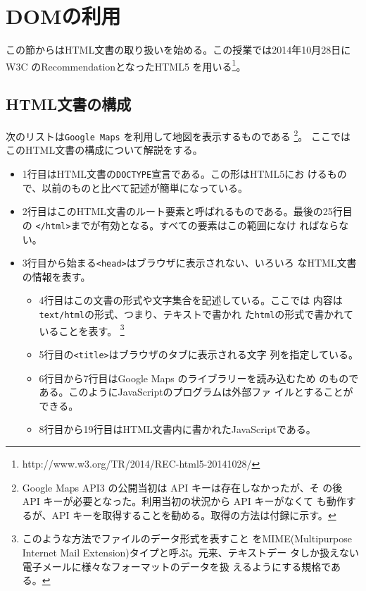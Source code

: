 \newcommand{\Elm}[1]{\texttt{<#1>}}
\newcommand{\Yes}{$\bigcirc$}
\newcommand{\No}{$\times$}
\chapter{DOMの利用}
この節からはHTML文書の取り扱いを始める。この授業では2014年10月28日にW3C
のRecommendationとなったHTML5
を用いる\footnote{http://www.w3.org/TR/2014/REC-html5-20141028/}。
\section{HTML文書の構成}
\begin{Exec}\upshape\label{ExGoogleMaps}
 次のリストは\texttt{Google Maps} を利用して地図を表示するものである
 \footnote{Google Maps API3 の公開当初は API キーは存在しなかったが、そ
 の後 API キーが必要となった。利用当初の状況から API キーがなくて
 も動作するが、API キーを取得することを勧める。取得の方法は付録に示す。}。
ここではこのHTML文書の構成について解説をする。
\begin{itemize}
 \item 1行目はHTML文書の\texttt{DOCTYPE}宣言である。この形はHTML5にお
       けるもので、以前のものと比べて記述が簡単になっている。
 \item 2行目はこのHTML文書のルート要素と呼ばれるものである。最後の25行目
       の \Elm{/html}までが有効となる。すべての要素はこの範囲になけ
       ればならない。
 \item 3行目から始まる\Elm{head}はブラウザに表示されない、いろいろ
       なHTML文書の情報を表す。
         \begin{itemize}
	  \item 4行目はこの文書の形式や文字集合を記述している。ここでは
		内容は\texttt{text/html}の形式、つまり、テキストで書かれ
		た\texttt{html}の形式で書かれていることを表す。
		\footnote{このような方法でファイルのデータ形式を表すこと
		をMIME(Multipurpose
		Internet Mail Extension)タイプと呼ぶ。元来、テキストデー
		タしか扱えない電子メールに様々なフォーマットのデータを扱
		えるようにする規格である。}
	  \item 5行目の\Elm{title}はブラウザのタブに表示される文字
		列を指定している。
	  \item 6行目から7行目はGoogle Maps のライブラリーを読み込むため
		のものである。このようにJavaScriptのプログラムは外部ファ
		イルとすることができる。
	  \item 8行目から19行目はHTML文書内に書かれたJavaScriptである。

\end{itemize}
\end{itemize}
\end{Exec}
